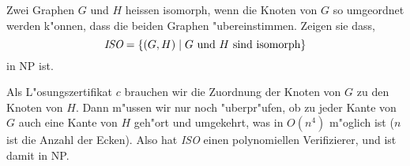Zwei Graphen $G$ und $H$ heissen isomorph, wenn die Knoten von $G$ so
umgeordnet werden k"onnen, dass die beiden Graphen "ubereinstimmen.
Zeigen sie dass,
\[
\text{\it ISO} = \{(G,H)\; |\;\text{$G$ und $H$ sind isomorph}\}
\]
in NP ist.

\begin{loesung}
Als L"osungszertifikat $c$ brauchen wir die Zuordnung der Knoten
von $G$ zu den Knoten von $H$. Dann m"ussen wir nur noch "uberpr"ufen,
ob zu jeder Kante von $G$ auch eine Kante von $H$ geh"ort und
umgekehrt, was in $O(n^4)$ m"oglich ist ($n$ ist die Anzahl der Ecken).
Also hat {\it ISO} einen polynomiellen Verifizierer, und ist damit
in NP.
\end{loesung}
